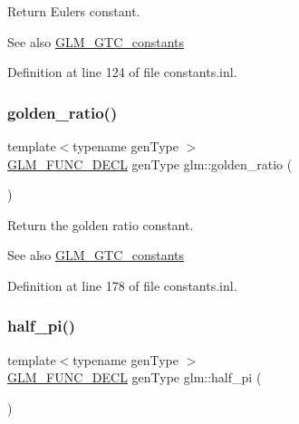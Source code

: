 Return Euler\textquotesingle{}s constant. \begin{DoxySeeAlso}{See also}
\hyperlink{group__gtc__constants}{G\+L\+M\+\_\+\+G\+T\+C\+\_\+constants} 
\end{DoxySeeAlso}


Definition at line 124 of file constants.\+inl.

\mbox{\label{group__gtc__constants_gafd53093ef2d756333865d774bea3cdf9}} 
\subsubsection{\texorpdfstring{golden\+\_\+ratio()}{golden\_ratio()}}
{\footnotesize\ttfamily template$<$typename gen\+Type $>$ \\
\hyperlink{setup_8hpp_ab2d052de21a70539923e9bcbf6e83a51}{G\+L\+M\+\_\+\+F\+U\+N\+C\+\_\+\+D\+E\+CL} gen\+Type glm\+::golden\+\_\+ratio (\begin{DoxyParamCaption}{ }\end{DoxyParamCaption})}

Return the golden ratio constant. \begin{DoxySeeAlso}{See also}
\hyperlink{group__gtc__constants}{G\+L\+M\+\_\+\+G\+T\+C\+\_\+constants} 
\end{DoxySeeAlso}


Definition at line 178 of file constants.\+inl.

\mbox{\label{group__gtc__constants_ga7f7a1050729f3b03b1873a06ba4a472f}} 
\subsubsection{\texorpdfstring{half\+\_\+pi()}{half\_pi()}}
{\footnotesize\ttfamily template$<$typename gen\+Type $>$ \\
\hyperlink{setup_8hpp_ab2d052de21a70539923e9bcbf6e83a51}{G\+L\+M\+\_\+\+F\+U\+N\+C\+\_\+\+D\+E\+CL} gen\+Type glm\+::half\+\_\+pi (\begin{DoxyParamCaption}{ }\end{DoxyParamCaption})}

